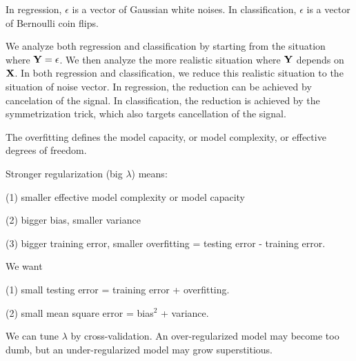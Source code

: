 \documentclass[11pt]{article}
\def\X{{\bf X}}
\def\Y{{\bf Y}}
\begin{document}
In regression, $\epsilon$ is a vector of Gaussian white noises. In classification, $\epsilon$ is a vector of Bernoulli coin flips. 

We analyze both regression and classification by starting from the situation where $\Y = \epsilon$. We then analyze the more realistic situation where $\Y$ depends on $\X$. In both regression and classification, we reduce this realistic situation to the situation of noise vector. In regression, the reduction can be achieved by cancelation of the signal. In classification, the reduction is achieved by the symmetrization trick, which also targets cancellation of the signal. 

The overfitting defines the model capacity, or model complexity, or effective degrees of freedom. 

Stronger regularization (big $\lambda$) means: 

(1) smaller effective model complexity or model capacity

(2) bigger bias, smaller variance

(3) bigger training error, smaller overfitting = testing error - training error. 


We want 

(1)  small testing error = training error + overfitting. 

(2)  small mean square error = bias$^2$ + variance. 


We can tune $\lambda$ by cross-validation. An over-regularized model may become too dumb, but an under-regularized model may grow superstitious. 
\end{document}
